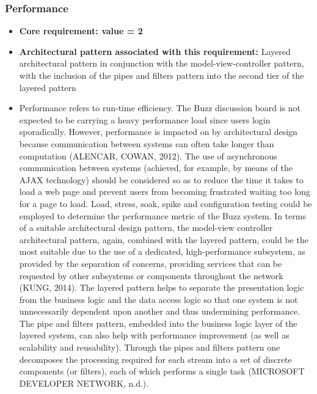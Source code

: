 \documentclass[a4paper]{article}
\begin{document}
\subsubsection{Performance}
\begin{itemize}
	\item \textbf{Core requirement: value = 2}
	\item \textbf{Architectural pattern associated with this requirement:} Layered architectural pattern in conjunction with the model-view-controller pattern, with the inclusion of the pipes and filters pattern into the second tier of the layered pattern
	\item Performance refers to run-time efficiency. The Buzz discussion board is not expected to be carrying a heavy performance load since users login sporadically. However, performance is impacted on by architectural design because communication between systems can often take longer than computation (ALENCAR, COWAN, 2012). The use of asynchronous communication between systems (achieved, for example, by means of the AJAX technology) should be considered so as to reduce the time it takes to load a web page and prevent users from becoming frustrated waiting too long for a page to load. Load, stress, soak, spike and configuration testing could be employed to determine the performance metric of the Buzz system. In terms of a suitable architectural design pattern, the model-view controller architectural pattern, again, combined with the layered pattern, could be the most suitable due to the use of a dedicated, high-performance subsystem, as provided by the separation of concerns, providing services that can be requested by other subsystems or components throughout the network (KUNG, 2014). The layered pattern helps to separate the presentation logic from the business logic and the data access logic so that one system is not unnecessarily dependent upon another and thus undermining performance. The pipe and filters pattern, embedded into the business logic layer of the layered system, can also help with performance improvement (as well as scalability and reusability). Through the pipes and filters pattern one decomposes the processing required for each stream into a set of discrete components (or filters), each of which performs a single task (MICROSOFT DEVELOPER NETWORK, n.d.). 
\end{itemize}
\end{document}
